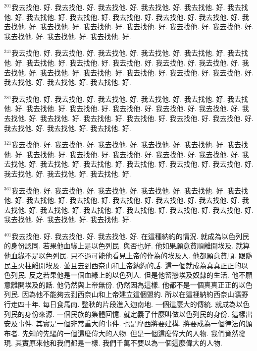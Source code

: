 \documentclass{book}
\begin{document}
$^{201}$我去找他.
好.
我去找他.
好.
我去找他.
好.
我去找他.
好.
我去找他.
好.
我去找他.
好.
我去找他.
好.
我去找他.
好.
我去找他.
好.
我去找他.
好.
我去找他.
好.
我去找他.
好.
我去找他.
好.
我去找他.
好.
我去找他.
好.
我去找他.
好.
我去找他.
好.
我去找他.
好.
我去找他.
好.
我去找他.
好.

$^{241}$我去找他.
好.
我去找他.
好.
我去找他.
好.
我去找他.
好.
我去找他.
好.
我去找他.
好.
我去找他.
好.
我去找他.
好.
我去找他.
好.
我去找他.
好.
我去找他.
好.
我去找他.
好.
我去找他.
好.
我去找他.
好.
我去找他.
好.
我去找他.
好.
我去找他.
好.
我去找他.
好.
我去找他.
好.
我去找他.
好.

$^{281}$我去找他.
好.
我去找他.
好.
我去找他.
好.
我去找他.
好.
我去找他.
好.
我去找他.
好.
我去找他.
好.
我去找他.
好.
我去找他.
好.
我去找他.
好.
我去找他.
好.
我去找他.
好.
我去找他.
好.
我去找他.
好.
我去找他.
好.
我去找他.
好.
我去找他.
好.
我去找他.
好.
我去找他.
好.
我去找他.
好.

$^{321}$我去找他.
好.
我去找他.
好.
我去找他.
好.
我去找他.
好.
我去找他.
好.
我去找他.
好.
我去找他.
好.
我去找他.
好.
我去找他.
好.
我去找他.
好.
我去找他.
好.
我去找他.
好.
我去找他.
好.
我去找他.
好.
我去找他.
好.
我去找他.
好.
我去找他.
好.
我去找他.
好.
我去找他.
好.
我去找他.
好.

$^{361}$我去找他.
好.
我去找他.
好.
我去找他.
好.
我去找他.
好.
我去找他.
好.
我去找他.
好.
我去找他.
好.
我去找他.
好.
我去找他.
好.
我去找他.
好.
我去找他.
好.
我去找他.
好.
我去找他.
好.
我去找他.
好.
我去找他.
好.
我去找他.
好.
我去找他.
好.
我去找他.
好.
我去找他.
好.
我去找他.
好.

$^{401}$我去找他.
好.
我去找他.
好.
我去找他.
好.
在這種納約的情況.
就成為以色列民的身份認同.
若果他血緣上是以色列民.
與否也好.
他如果願意貧順離開埃及.
就算他血緣不是以色列民.
只不過可能他看見上帝的作為的埃及人.
他都願意貧順.
跟隨民主火柱離開埃及.
並且去到西奈山和上帝納約的話.
這一個就成為真真正正的以色列民.
反之若果他是一個血緣上的以色列人.
但是他留戀埃及奴隸的生活.
他不願意離開埃及的話.
他仍然與上帝無份.
仍然因為這樣.
他都不是一個真真正正的以色列民.
因為他不能夠去到西奈山和上帝建立這個盟約.
所以在這裡納約西奈山曠野行走四十年.
每日食馬南.
整秋的片段進入迦南地.
一個這麼大的傳統.
就成為以色列民的身份來源.
一個民族的集體回憶.
就定義了什麼叫做以色列民的身份.
這樣出安及事件.
其實是一個非常重大的事件.
也是摩西將要建構.
將要成為一個律法的頒布者.
先知的先驅的一個這麼偉大的人物.
但是一個這麼偉大的人物.
我們竟然發現.
其實原來他和我們都是一樣.
我們千萬不要以為一個這麼偉大的人物.
\end{document}
